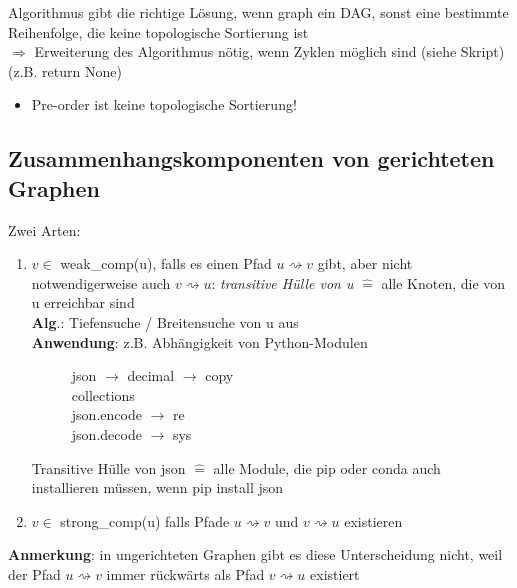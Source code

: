 \documentclass[11pt, fleqn]{scrreprt}
\begin{document}
	Algorithmus gibt die richtige Lösung, wenn graph ein DAG, sonst eine bestimmte Reihenfolge, die keine topologische Sortierung ist\\
	$\Rightarrow$ Erweiterung des Algorithmus nötig, wenn Zyklen möglich sind (siehe Skript) (z.B. return None)
	\begin{itemize}
		\item Pre-order ist keine topologische Sortierung!
	\end{itemize}

	\subsection*{Zusammenhangskomponenten von gerichteten Graphen}
	
	Zwei Arten:
	\begin{enumerate}
		\item $v \in$ weak\_comp(u), falls es einen Pfad $u \rightsquigarrow v$ gibt, aber nicht notwendigerweise auch $v \rightsquigarrow u$: \emph{transitive Hülle von u} $\widehat{=}$ alle Knoten, die von u erreichbar sind\\
		\textbf{Alg}.: Tiefensuche / Breitensuche von u aus \\
		\textbf{Anwendung}: z.B. Abhängigkeit von Python-Modulen
		
		\begin{figure}[htbp]
			\hspace*{2cm}json $\rightarrow$ decimal $\rightarrow$ copy \\
			\hspace*{5cm}  collections\\
			\hspace*{3cm}  json.encode \raisebox{-1.5mm}{$\searrow$} \hspace*{-5mm}$\rightarrow$ re\\
			\hspace*{3cm}  json.decode \raisebox{2mm}{$\nearrow$} \hspace*{-6mm} $\rightarrow$ sys
		\end{figure}
		Transitive Hülle von json $\widehat{=}$ alle Module, die pip oder conda auch installieren müssen, wenn \glqq pip install json\grqq
		\item $v \in$ strong\_comp(u) falls Pfade $u \rightsquigarrow v$ und $v \rightsquigarrow u$ existieren
	\end{enumerate}
	\textbf{Anmerkung}: in ungerichteten Graphen gibt es diese Unterscheidung nicht, weil der Pfad $u \rightsquigarrow v$ immer rückwärts als Pfad $v \rightsquigarrow u$ existiert\\
	
\end{document}
